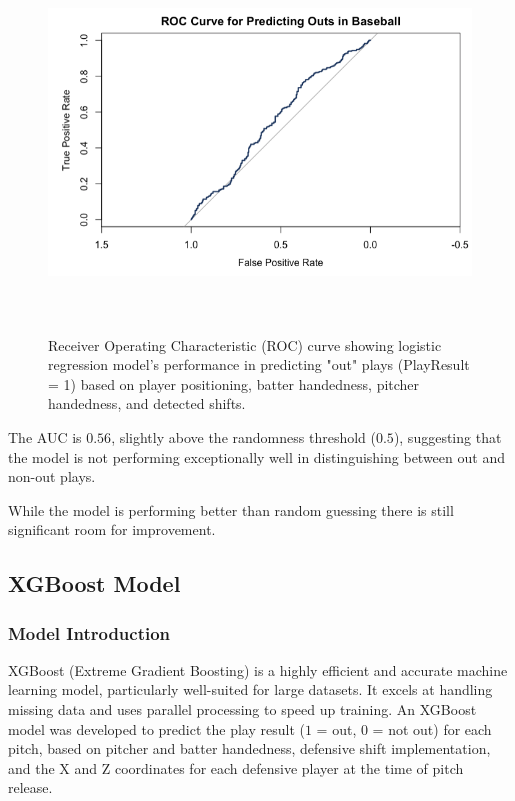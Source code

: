 \documentclass{article}
\begin{document}
\newpage
\begin{figure}[h]
    \centering
    \includegraphics[height=10cm]{images/roc_lr.png}
    \caption{Receiver Operating Characteristic (ROC) curve showing logistic regression model's performance in predicting "out" plays (PlayResult = 1) based on player positioning, batter handedness, pitcher handedness, and detected shifts.}
\end{figure}

The AUC is $0.56$, slightly above the randomness threshold ($0.5$), suggesting that the model is not performing exceptionally well in distinguishing between out and non-out plays.

While the model is performing better than random guessing there is still significant room for improvement. 

\subsection{XGBoost Model}
\subsubsection{Model Introduction}
XGBoost (Extreme Gradient Boosting) is a highly efficient and accurate machine learning model, particularly well-suited for large datasets. It excels at handling missing data and uses parallel processing to speed up training. An XGBoost model was developed to predict the play result ($1$ = out, $0$ = not out) for each pitch, based on pitcher and batter handedness, defensive shift implementation, and the X and Z coordinates for each defensive player at the time of pitch release.
\end{document}

